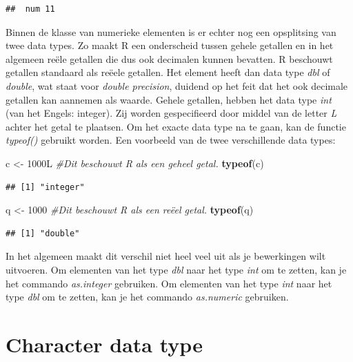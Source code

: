 \documentclass[
]{book}
\newenvironment{Shaded}{\begin{snugshade}}{\end{snugshade}}
\newcommand{\CommentTok}[1]{\textcolor[rgb]{0.56,0.35,0.01}{\textit{#1}}}
\newcommand{\DecValTok}[1]{\textcolor[rgb]{0.00,0.00,0.81}{#1}}
\newcommand{\FunctionTok}[1]{\textcolor[rgb]{0.13,0.29,0.53}{\textbf{#1}}}
\newcommand{\NormalTok}[1]{#1}
\newcommand{\OtherTok}[1]{\textcolor[rgb]{0.56,0.35,0.01}{#1}}
\begin{document}
\begin{verbatim}
##  num 11
\end{verbatim}

Binnen de klasse van numerieke elementen is er echter nog een opsplitsing van twee data types. Zo maakt R een onderscheid tussen gehele getallen en in het algemeen reële getallen die dus ook decimalen kunnen bevatten. R beschouwt getallen standaard als reëele getallen. Het element heeft dan data type \emph{dbl} of \emph{double}, wat staat voor \emph{double precision}, duidend op het feit dat het ook decimale getallen kan aannemen als waarde. Gehele getallen, hebben het data type \emph{int} (van het Engels: integer). Zij worden gespecifieerd door middel van de letter \emph{L} achter het getal te plaatsen. Om het exacte data type na te gaan, kan de functie \emph{typeof()} gebruikt worden. Een voorbeeld van de twee verschillende data types:

\begin{Shaded}
\begin{Highlighting}[]
\NormalTok{c }\OtherTok{\textless{}{-}}\NormalTok{ 1000L }\CommentTok{\#Dit beschouwt R als een geheel getal.}
\FunctionTok{typeof}\NormalTok{(c)}
\end{Highlighting}
\end{Shaded}

\begin{verbatim}
## [1] "integer"
\end{verbatim}

\begin{Shaded}
\begin{Highlighting}[]
\NormalTok{q }\OtherTok{\textless{}{-}} \DecValTok{1000} \CommentTok{\#Dit beschouwt R als een reëel getal.}
\FunctionTok{typeof}\NormalTok{(q)}
\end{Highlighting}
\end{Shaded}

\begin{verbatim}
## [1] "double"
\end{verbatim}

In het algemeen maakt dit verschil niet heel veel uit als je bewerkingen wilt uitvoeren. Om elementen van het type \emph{dbl} naar het type \emph{int} om te zetten, kan je het commando \emph{as.integer} gebruiken. Om elementen van het type \emph{int} naar het type \emph{dbl} om te zetten, kan je het commando \emph{as.numeric} gebruiken.

\hypertarget{character-data-type}{%
\section{Character data type}\label{character-data-type}}
\end{document}
